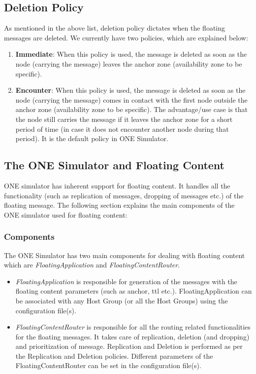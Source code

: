 \subsection {Deletion Policy}
As mentioned in the above list, deletion policy dictates when the floating messages are deleted. We currently have two policies, which are explained below:
  \begin{enumerate}
    \item \textbf{Immediate}: When this policy is used, the message is deleted as soon as the node (carrying the message) leaves the anchor zone (availability zone to be specific).
    \item \textbf{Encounter}: When this policy is used, the message is deleted as soon as the node (carrying the message) comes in contact with the first node outside the anchor zone (availability zone to be specific). The advantage/use case is that the node still carries the message if it leaves the anchor zone for a short period of time (in case it does not encounter another node during that period). It is the default policy in ONE Simulator.
  \end{enumerate}

\subsection{The ONE Simulator and Floating Content}
ONE simulator has inherent support for floating content. It handles all the functionality (such as replication of messages, dropping of messages etc.) of the floating message. The following section explains the main components of the ONE simulator used for floating content:

\subsubsection{Components}
The ONE Simulator has two main components for dealing with floating content which are \textit{FloatingApplication} and \textit{FloatingContentRouter}.

\begin{itemize}
\item \textit{FloatingApplication} is responsible for generation of the messages with the floating content parameters (such as anchor, ttl etc.). FloatingApplication can be associated with any Host Group (or all the Host Groups) using the configuration file(s).
\item \textit{FloatingContentRouter} is responsible for all the routing related functionalities for the floating messages. It takes care of replication, deletion (and dropping) and prioritization of message. Replication and Deletion is performed as per the Replication and Deletion policies. Different parameters of the FloatingContentRouter can be set in the configuration file(s).
\end{itemize}

